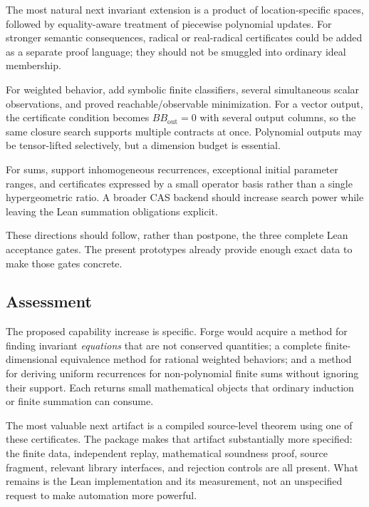 The most natural next invariant extension is a product of location-specific
spaces, followed by equality-aware treatment of piecewise polynomial updates.
For stronger semantic consequences, radical or real-radical certificates could
be added as a separate proof language; they should not be smuggled into ordinary
ideal membership.

For weighted behavior, add symbolic finite classifiers, several simultaneous
scalar observations, and proved reachable/observable minimization. For a vector
output, the certificate condition becomes $BB_{\mathrm{out}}=0$ with several
output columns, so the same closure search supports multiple contracts at
once. Polynomial outputs may be tensor-lifted selectively, but a dimension
budget is essential.

For sums, support inhomogeneous recurrences, exceptional initial parameter
ranges, and certificates expressed by a small operator basis rather than a
single hypergeometric ratio. A broader CAS backend should increase search
power while leaving the Lean summation obligations explicit.

These directions should follow, rather than postpone, the three complete Lean
acceptance gates. The present prototypes already provide enough exact data to
make those gates concrete.

\subsection{Assessment}

The proposed capability increase is specific. Forge would acquire a method for
finding invariant \emph{equations} that are not conserved quantities; a complete
finite-dimensional equivalence method for rational weighted behaviors; and a
method for deriving uniform recurrences for non-polynomial finite sums without
ignoring their support. Each returns small mathematical objects that ordinary
induction or finite summation can consume.

The most valuable next artifact is a compiled source-level theorem using one
of these certificates. The package makes that artifact substantially more
specified: the finite data, independent replay, mathematical soundness proof,
source fragment, relevant library interfaces, and rejection controls are all
present. What remains is the Lean implementation and its measurement, not an
unspecified request to make automation more powerful.
